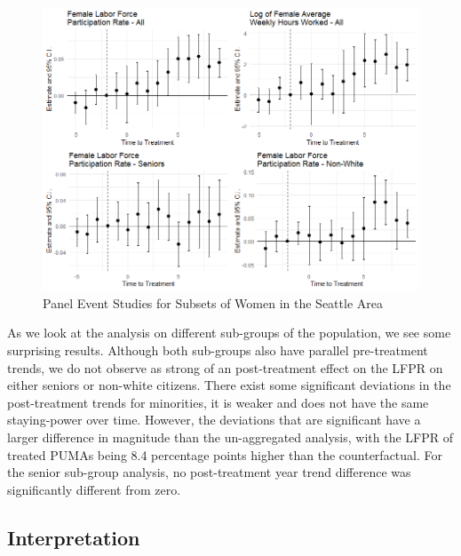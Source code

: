 \documentclass[A4paper,12pt]{article}
\begin{document}
\begin{figure}[h]
\caption{Panel Event Studies for Subsets of Women in the Seattle Area}
\label{seattle_dind}
\centering
\includegraphics[width=1.0\textwidth]{Graphs/dynamic_seattle.png}
\end{figure}

As we look at the analysis on different sub-groups of the population, we see some surprising results. Although both sub-groups also have parallel pre-treatment trends, we do not observe as strong of an post-treatment effect on the LFPR on either seniors or non-white citizens. There exist some significant deviations in the post-treatment trends for minorities, it is weaker and does not have the same staying-power over time. However, the deviations that are significant have a larger difference in magnitude than the un-aggregated analysis, with the LFPR of treated PUMAs being 8.4 percentage points higher than the counterfactual. For the senior sub-group analysis, no post-treatment year trend difference was significantly different from zero.\\

\subsection{Interpretation}
\end{document}
